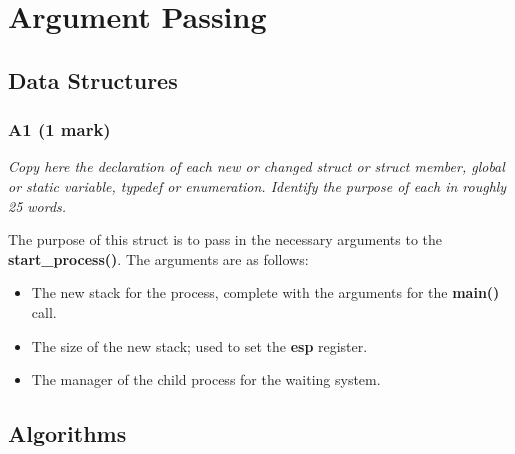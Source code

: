 \documentclass{report}
\newcommand{\question}[1]{\textit{#1} \ }
\newcommand{\fun}[1]{\textcolor{Emerald}{\textbf{#1}}}
\newcommand{\var}[1]{\textcolor{RoyalPurple}{\textbf{#1}}}
\newcommand{\pintoscode}[4]{}
\begin{document}
    \section*{Argument Passing}
        \subsection*{Data Structures}
            \subsubsection*{A1 (1 mark)}
                \question{Copy here the declaration of each new or changed struct or struct member, global or static variable, typedef or
                enumeration. Identify the purpose of each in roughly 25 words.}

								\pintoscode{31}{35}{Process info struct}{process.c}
								The purpose of this struct is to pass in the necessary arguments to the \fun{start\_process()}.
								The arguments are as follows:
								\begin{itemize}
									\item The new stack for the process, complete with the arguments for the \fun{main()} call.
									\item The size of the new stack; used to set the \var{esp} register.
									\item The manager of the child process for the waiting system.
								\end{itemize}

        \subsection*{Algorithms}
\end{document}
